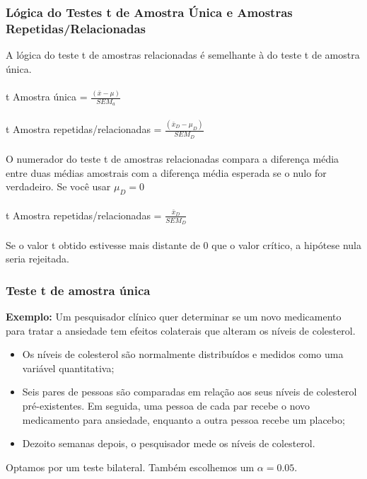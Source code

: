 \documentclass[11pt]{beamer}
\begin{document}
\begin{frame}
\frametitle{Lógica do Testes t de Amostra Única e Amostras Repetidas/Relacionadas}
A lógica do teste t de amostras relacionadas é semelhante à do teste t de amostra única.\\~\\

t Amostra única = $\frac{(\bar{x} - \mu)}{SEM_a}$\\~\\

t Amostra repetidas/relacionadas = $\frac{(\bar{x}_D - \mu_D)}{SEM_D}$\\~\\

O numerador do teste t de amostras relacionadas compara a diferença média entre duas médias amostrais com a diferença média esperada se o nulo for verdadeiro. Se você usar $\mu_D = 0$\\~\\

t Amostra repetidas/relacionadas = $\frac{\bar{x}_D}{SEM_D}$\\~\\

Se o valor t obtido estivesse mais distante de 0 que o valor crítico, a hipótese nula seria rejeitada.

\end{frame}

\begin{frame}
\frametitle{Teste t de amostra única}

\textbf{Exemplo:} Um pesquisador clínico quer determinar se um novo medicamento para tratar a ansiedade tem efeitos colaterais que alteram os níveis de colesterol. 
 
\begin{itemize}
\item Os níveis de colesterol são normalmente distribuídos e medidos como uma variável quantitativa;
\item
   Seis pares de pessoas são comparadas em relação aos seus níveis de colesterol pré-existentes. Em seguida, uma pessoa de cada par recebe o novo medicamento para ansiedade, enquanto a outra pessoa recebe um placebo;
\item
  Dezoito semanas depois, o pesquisador mede os níveis de colesterol.
\end{itemize}

Optamos por um teste bilateral. Também escolhemos um \(\alpha=0.05\).

\end{frame}
\end{document}
